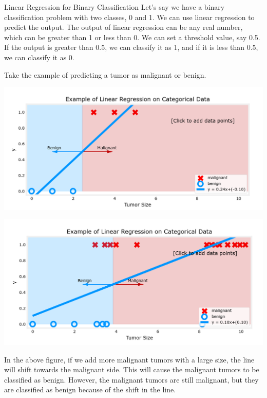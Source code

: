 \begin{exbox}{Linear Regression for Binary Classification}{}
    \hspace{2em}Let's say we have a binary classification problem with two classes, 0 and 1.
    We can use linear regression to predict the output.
    The output of linear regression can be any real number, which can be greater than 1 or less than 0.
    We can set a threshold value, say 0.5. If the output is greater than 0.5, we can classify it as 1, and if it is less than 0.5, we can classify it as 0.\par
    \hspace{2em}Take the example of predicting a tumor as malignant or benign.

    \begin{minipage}{0.5\textwidth}
        \includegraphics[width=\textwidth]{images/6.1.1.png}
    \end{minipage}
    \begin{minipage}{0.5\textwidth}
        \includegraphics[width=\textwidth]{images/6.1.2.png}
    \end{minipage}

    \hspace{2em}In the above figure, if we add more malignant tumors with a large size, the line will shift towards the malignant side.
    This will cause the malignant tumors to be classified as benign.
    However, the malignant tumors are still malignant, but they are classified as benign because of the shift in the line.
\end{exbox}


